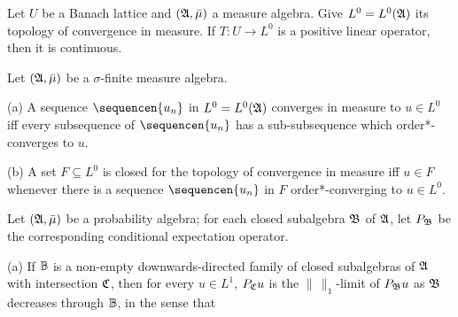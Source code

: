 Let $U$ be a Banach lattice and
$(\frak A,\bar\mu)$ a measure algebra.   Give $L^0=L^0(\frak A)$ its
topology of convergence in measure.   If $T:U\to L^0$ is a
positive linear operator, then it is continuous.
     
     
Let $(\frak A,\bar\mu)$ be a $\sigma$-finite measure algebra.
     
(a) A sequence $\sequencen{u_n}$ in $L^0=L^0(\frak A)$ converges in
measure to $u\in L^0$ iff every subsequence of $\sequencen{u_n}$ has a
sub-subsequence which order*-converges to $u$.
     
(b) A set $F\subseteq L^0$ is closed for the topology of convergence in
measure iff $u\in F$ whenever there is a sequence $\sequencen{u_n}$ in
$F$ order*-converging to $u\in L^0$.
     

Let $(\frak A,\bar\mu)$ be a probability algebra; 
for each closed subalgebra $\frak B$ of $\frak A$, let 
$P_{\frak B}$ be the corresponding conditional expectation operator.

(a) If $\Bbb B$ is a non-empty downwards-directed family of closed
subalgebras of $\frak A$ with intersection $\frak C$, then for every 
$u\in L^1$, $P_{\frak C}u$ is the $\|\,\|_1$-limit of $P_{\frak B}u$ as
$\frak B$ decreases through $\Bbb B$, in the sense that


